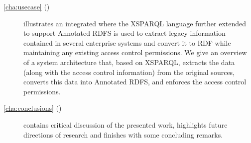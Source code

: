 \begin{description}
\item[\cref{cha:usecase} ()] illustrates an integrated \usecase where the XSPARQL language further
  extended to support Annotated RDFS is used to extract legacy information contained in several enterprise systems and
  convert it to \ac{RDF} while maintaining any existing access control permissions.  We give an overview of a system
  architecture that, based on XSPARQL, extracts the data (along with the access control information) from the original
  sources, converts this data into Annotated RDFS, and enforces the access control permissions.

\item[\cref{cha:conclusions} ()] contains critical discussion of the presented work,
  highlights future directions of research and finishes with some concluding remarks.

\end{description}



